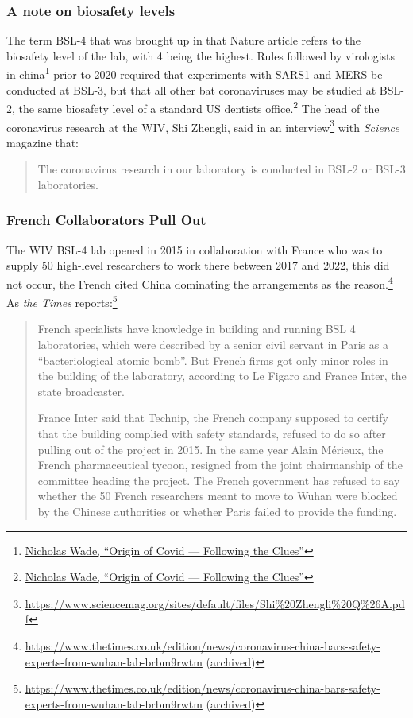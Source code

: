 \documentclass[11pt]{article}
\begin{document}
\subsubsection{A note on biosafety levels}
\label{sec:orga793d0e}
The term BSL-4 that was brought up in that Nature article refers to the biosafety level of the lab, with 4 being the highest. Rules followed by virologists in china\footnote{\href{https://nicholaswade.medium.com/origin-of-covid-following-the-clues-6f03564c038}{Nicholas Wade, ``Origin of Covid --- Following the Clues''}} prior to 2020 required that experiments with SARS1 and MERS be conducted at BSL-3, but that all other bat coronaviruses may be studied at BSL-2, the same biosafety level of a standard US dentists office.\footnote{\href{https://nicholaswade.medium.com/origin-of-covid-following-the-clues-6f03564c038}{Nicholas Wade, ``Origin of Covid --- Following the Clues''}} The head of the coronavirus research at the WIV, Shi Zhengli, said in an interview\footnote{\url{https://www.sciencemag.org/sites/default/files/Shi\%20Zhengli\%20Q\%26A.pdf}} with \emph{Science} magazine that:
\begin{quote}
The coronavirus research in our laboratory is conducted in BSL-2 or BSL-3 laboratories.
\end{quote}
\subsubsection{French Collaborators Pull Out}
\label{sec:orge4133a7}
The WIV BSL-4 lab opened in 2015 in collaboration with France who was to supply 50 high-level researchers to work there between 2017 and 2022, this did not occur, the French cited China dominating the arrangements as the reason.\footnote{\url{https://www.thetimes.co.uk/edition/news/coronavirus-china-bars-safety-experts-from-wuhan-lab-brbm9rwtm} (\href{http://archive.is/Ghj93}{archived})} As \emph{the Times} reports:\footnote{\url{https://www.thetimes.co.uk/edition/news/coronavirus-china-bars-safety-experts-from-wuhan-lab-brbm9rwtm} (\href{http://archive.is/Ghj93}{archived})}
\begin{quote}
French specialists have knowledge in building and running BSL 4 laboratories, which were described by a senior civil servant in Paris as a “bacteriological atomic bomb”. But French firms got only minor roles in the building of the laboratory, according to Le Figaro and France Inter, the state broadcaster.

France Inter said that Technip, the French company supposed to certify that the building complied with safety standards, refused to do so after pulling out of the project in 2015. In the same year Alain Mérieux, the French pharmaceutical tycoon, resigned from the joint chairmanship of the committee heading the project. The French government has refused to say whether the 50 French researchers meant to move to Wuhan were blocked by the Chinese authorities or whether Paris failed to provide the funding.
\end{quote}
\end{document}
